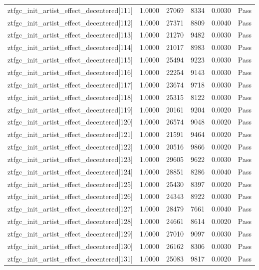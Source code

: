 \begin{table}[htbp]
\begin{tabular}{llrrll}
ztfgc\_init\_artist\_effect\_decentered[111] & 1.0000 & 27069 & 8334 & 0.0030 & Pass \\
ztfgc\_init\_artist\_effect\_decentered[112] & 1.0000 & 27371 & 8809 & 0.0040 & Pass \\
ztfgc\_init\_artist\_effect\_decentered[113] & 1.0000 & 21270 & 9482 & 0.0030 & Pass \\
ztfgc\_init\_artist\_effect\_decentered[114] & 1.0000 & 21017 & 8983 & 0.0030 & Pass \\
ztfgc\_init\_artist\_effect\_decentered[115] & 1.0000 & 25494 & 9223 & 0.0030 & Pass \\
ztfgc\_init\_artist\_effect\_decentered[116] & 1.0000 & 22254 & 9143 & 0.0030 & Pass \\
ztfgc\_init\_artist\_effect\_decentered[117] & 1.0000 & 23674 & 9718 & 0.0030 & Pass \\
ztfgc\_init\_artist\_effect\_decentered[118] & 1.0000 & 25315 & 8122 & 0.0030 & Pass \\
ztfgc\_init\_artist\_effect\_decentered[119] & 1.0000 & 20161 & 9204 & 0.0020 & Pass \\
ztfgc\_init\_artist\_effect\_decentered[120] & 1.0000 & 26574 & 9048 & 0.0020 & Pass \\
ztfgc\_init\_artist\_effect\_decentered[121] & 1.0000 & 21591 & 9464 & 0.0020 & Pass \\
ztfgc\_init\_artist\_effect\_decentered[122] & 1.0000 & 20516 & 9866 & 0.0020 & Pass \\
ztfgc\_init\_artist\_effect\_decentered[123] & 1.0000 & 29605 & 9622 & 0.0030 & Pass \\
ztfgc\_init\_artist\_effect\_decentered[124] & 1.0000 & 28851 & 8286 & 0.0040 & Pass \\
ztfgc\_init\_artist\_effect\_decentered[125] & 1.0000 & 25430 & 8397 & 0.0020 & Pass \\
ztfgc\_init\_artist\_effect\_decentered[126] & 1.0000 & 24343 & 8922 & 0.0030 & Pass \\
ztfgc\_init\_artist\_effect\_decentered[127] & 1.0000 & 28479 & 7661 & 0.0040 & Pass \\
ztfgc\_init\_artist\_effect\_decentered[128] & 1.0000 & 24661 & 8614 & 0.0020 & Pass \\
ztfgc\_init\_artist\_effect\_decentered[129] & 1.0000 & 27010 & 9097 & 0.0030 & Pass \\
ztfgc\_init\_artist\_effect\_decentered[130] & 1.0000 & 26162 & 8306 & 0.0030 & Pass \\
ztfgc\_init\_artist\_effect\_decentered[131] & 1.0000 & 25083 & 9817 & 0.0020 & Pass \\

\end{tabular}
\end{table}
